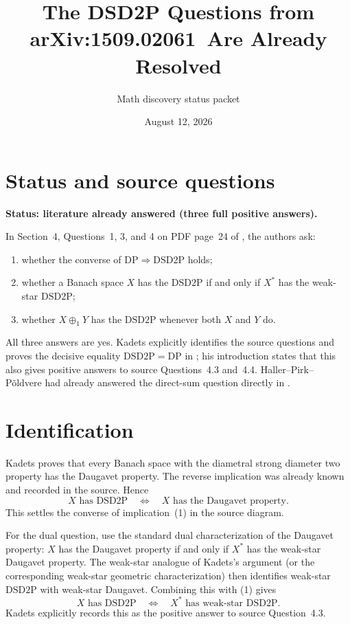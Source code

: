 \documentclass[11pt]{article}
\title{The DSD2P Questions from arXiv:1509.02061\ Are Already Resolved}
\author{Math discovery status packet}
\date{August 12, 2026}
\newcommand{\DSD}{\mathrm{DSD2P}}
\begin{document}
\maketitle

\section*{Status and source questions}

\textbf{Status: literature already answered (three full positive answers).}

In Section~4, Questions~1, 3, and 4 on PDF page~24 of
\cite{BLR}, the authors ask:
\begin{enumerate}
\item whether the converse of
  $\mathrm{DP}\Rightarrow\DSD$ holds;
\item whether a Banach space $X$ has the $\DSD$ if and only if
  $X^*$ has the weak-star $\DSD$;
\item whether $X\oplus_1Y$ has the $\DSD$ whenever both $X$ and $Y$ do.
\end{enumerate}

All three answers are yes.  Kadets explicitly identifies the source
questions and proves the decisive equality $\DSD=\mathrm{DP}$ in
\cite[Theorem~2.3, PDF pp.~3--4]{Kadets}; his introduction states that this
also gives positive answers to source Questions~4.3 and~4.4.  Haller--Pirk--
P\~oldvere had already answered the direct-sum question directly in
\cite[Theorem, PDF p.~1]{HPP}.

\section*{Identification}

Kadets proves that every Banach space with the diametral strong diameter two
property has the Daugavet property.  The reverse implication was already
known and recorded in the source.  Hence
\[
                 X\text{ has }\DSD
                 \quad\Longleftrightarrow\quad
                 X\text{ has the Daugavet property}.                 \tag{1}
\]
This settles the converse of implication~(1) in the source diagram.

For the dual question, use the standard dual characterization of the
Daugavet property: $X$ has the Daugavet property if and only if $X^*$ has
the weak-star Daugavet property.  The weak-star analogue of Kadets's
argument (or the corresponding weak-star geometric characterization) then
identifies weak-star $\DSD$ with weak-star Daugavet.  Combining this with
(1) gives
\[
 X\text{ has }\DSD
 \quad\Longleftrightarrow\quad
 X^*\text{ has weak-star }\DSD.
\]
Kadets explicitly records this as the positive answer to source
Question~4.3.
\end{document}
